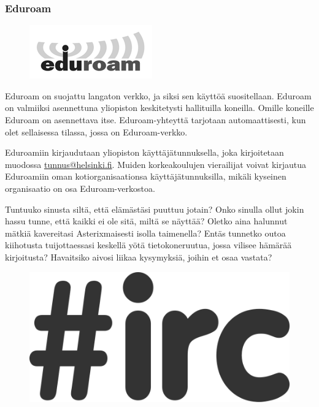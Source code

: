 \documentclass[a5paper, 8pt, twocolumn]{book} %
\numberwithin{equation}{section}
\begin{document}
\subsubsection*{Eduroam}
\begin{figure}[h!]
	\centering
	\includegraphics[width=\columnwidth]{eduroam_logo.png}
\end{figure}
Eduroam on suojattu langaton verkko, ja siksi sen käyttöä suositellaan. Eduroam on valmiiksi asennettuna yliopiston keskitetysti hallituilla koneilla. Omille koneille Eduroam on asennettava itse. Eduroam-yhteyttä tarjotaan automaattisesti, kun olet sellaisessa tilassa, jossa on Eduroam-verkko.

Eduroamiin kirjaudutaan yliopiston käyttäjätunnuksella, joka kirjoitetaan muodossa \url{tunnus@helsinki.fi}. Muiden korkeakoulujen vierailijat voivat kirjautua Eduroamiin oman kotiorganisaationsa käyttäjätunnuksilla, mikäli kyseinen organisaatio on osa Eduroam-verkostoa.

Tuntuuko sinusta siltä, että elämästäsi
puuttuu jotain? Onko sinulla ollut jokin
hassu tunne, että kaikki ei ole sitä, miltä se
näyttää? Oletko aina halunnut mätkiä kavereitasi
Asterixmaisesti isolla taimenella?
Entäs tunnetko outoa kiihotusta tuijottaessasi
keskellä yötä tietokoneruutua, jossa vilisee
hämärää kirjoitusta? Havaitsiko aivosi
liikaa kysymyksiä, joihin et osaa vastata?
\begin{figure}[!b]
	\centering
	\includegraphics[width=0.8\columnwidth]{irckuva.png}
\end{figure}
\end{document}
